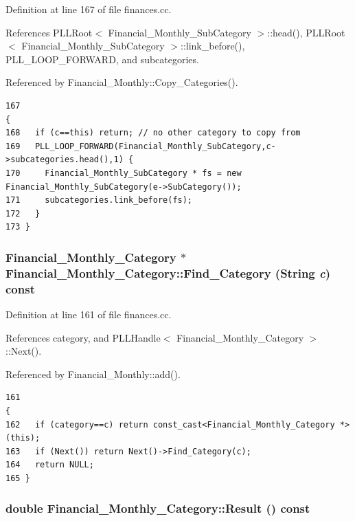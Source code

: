 Definition at line 167 of file finances.cc.

References PLLRoot$<$ Financial\_\-Monthly\_\-Sub\-Category $>$::head(), PLLRoot$<$ Financial\_\-Monthly\_\-Sub\-Category $>$::link\_\-before(), PLL\_\-LOOP\_\-FORWARD, and subcategories.

Referenced by Financial\_\-Monthly::Copy\_\-Categories().



\footnotesize\begin{verbatim}167                                                                                   {
168   if (c==this) return; // no other category to copy from
169   PLL_LOOP_FORWARD(Financial_Monthly_SubCategory,c->subcategories.head(),1) {
170     Financial_Monthly_SubCategory * fs = new Financial_Monthly_SubCategory(e->SubCategory());
171     subcategories.link_before(fs);
172   }
173 }
\end{verbatim}\normalsize 
{}
\subsubsection{\setlength{\rightskip}{0pt plus 5cm}Financial\_\-Monthly\_\-Category $\ast$ Financial\_\-Monthly\_\-Category::Find\_\-Category ({\bf String} {\em c}) const}\label{classFinancial__Monthly__Category_a2}




Definition at line 161 of file finances.cc.

References category, and PLLHandle$<$ Financial\_\-Monthly\_\-Category $>$::Next().

Referenced by Financial\_\-Monthly::add().



\footnotesize\begin{verbatim}161                                                                                      {
162   if (category==c) return const_cast<Financial_Monthly_Category *>(this);
163   if (Next()) return Next()->Find_Category(c);
164   return NULL;
165 }
\end{verbatim}\normalsize 
{}
\subsubsection{\setlength{\rightskip}{0pt plus 5cm}double Financial\_\-Monthly\_\-Category::Result () const\hspace{0.3cm}{\tt  [inline]}}\label{classFinancial__Monthly__Category_a3}




